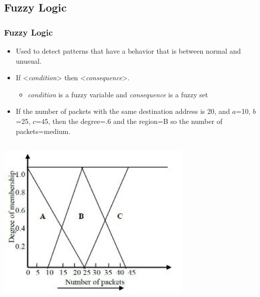 \documentclass{beamer}
\begin{document}
\subsection{Fuzzy Logic}
\begin{frame}
  \frametitle{Fuzzy Logic}

  \begin{itemize}
  	\item Used to detect patterns that have a behavior that is between normal and unusual.
  	\item If <\emph{condition}> then <\emph{consequence}>.
  	\begin{itemize}
  		\item \emph{condition} is a fuzzy variable and \emph{consequence} is a fuzzy set
  	\end{itemize}
  	\item If the number of packets with the same destination address is 20, and $a$=10, $b$=25, $c$=45, then the degree=.6 and the region=B so the number of packets=medium.
  \end{itemize} 
  
  \begin{columns}
  \begin{column}{0.4\textwidth}
      \includegraphics[width=0.95\textwidth]{../triangleFigure.JPG} 
  \end{column}

  \begin{column}{0.6\textwidth}
  \begin{algorithmic}
	\ELSE {}
	\ENDIF
  \end{algorithmic}
  \end{column}
  \end{columns}
\end{frame}
\end{document}
